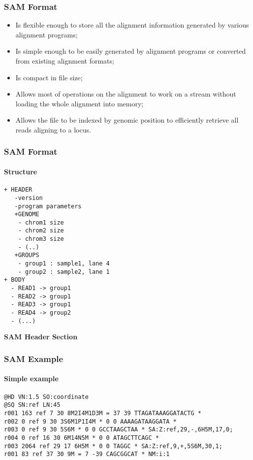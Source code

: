 \documentclass{beamer}
\newcommand{\centeredtitle}[1]{
\begin{center}
    \Huge{\bf{#1}}
\end{center}
}
\newcommand{\hugeslide}[1]{
\begin{frame}
\centeredtitle{#1}
\end{frame}
}
\begin{document}
\begin{frame}[fragile]
\frametitle{SAM Format}
\begin{itemize}
\item Is flexible enough to store all the alignment information generated by various alignment programs;
\item Is simple enough to be easily generated by alignment programs or converted from existing alignment formats;
\item Is compact in file size;
\item Allows most of operations on the alignment to work on a stream without loading the whole alignment into memory;
\item Allows the file to be indexed by genomic position to efficiently retrieve all reads aligning to a locus. 
\end{itemize}
\end{frame}



\begin{frame}[fragile]
\frametitle{SAM Format}
\framesubtitle{Structure}
\begin{verbatim}
+ HEADER
   -version
   -program parameters
   +GENOME
   	- chrom1 size
   	- chrom2 size
   	- chrom3 size
   	- (..)
   +GROUPS
   	- group1 : sample1, lane 4
   	- group2 : sample2, lane 1
+ BODY
  - READ1 -> group1
  - READ2 -> group1
  - READ3 -> group1
  - READ4 -> group2
  - (...)
\end{verbatim}
\end{frame}

\hugeslide{SAM Header Section}

\begin{frame}[fragile]
\frametitle{SAM Example}
\framesubtitle{Simple example}
\begin{framed}\tiny
\begin{verbatim}
@HD VN:1.5 SO:coordinate
@SQ SN:ref LN:45
r001 163 ref 7 30 8M2I4M1D3M = 37 39 TTAGATAAAGGATACTG *
r002 0 ref 9 30 3S6M1P1I4M * 0 0 AAAAGATAAGGATA *
r003 0 ref 9 30 5S6M * 0 0 GCCTAAGCTAA * SA:Z:ref,29,-,6H5M,17,0;
r004 0 ref 16 30 6M14N5M * 0 0 ATAGCTTCAGC *
r003 2064 ref 29 17 6H5M * 0 0 TAGGC * SA:Z:ref,9,+,5S6M,30,1;
r001 83 ref 37 30 9M = 7 -39 CAGCGGCAT * NM:i:1
\end{verbatim}
\end{framed}
\end{frame}
\end{document}
